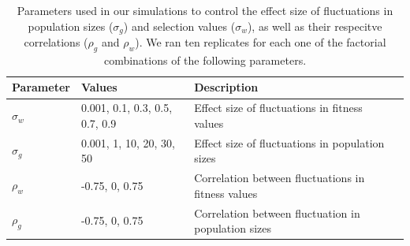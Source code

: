 \documentclass[12pt]{article}
\begin{document}
\begin{table}[h]
\fontsize{10}{18}\selectfont
\centering
\caption{Parameters used in our simulations to control the effect size of fluctuations in population sizes ($\sigma_{g}$) and selection values ($\sigma_{w}$), as well as their respecitve correlations ($\rho_{g}$ and $\rho_{w}$). We ran ten replicates for each one  of the factorial combinations of the following parameters. }
\begin{tabular}{@{}llll@{}}
\toprule
Parameter                    & Values                    & Description                                   &  \\ \midrule
$\sigma_{w}$ & 0.001, 0.1, 0.3, 0.5, 0.7, 0.9 & Effect size of fluctuations in fitness values &  \\
$\sigma_{g}$ & 0.001, 1, 10, 20, 30, 50 & Effect size of fluctuations in population sizes                                              &  \\
$\rho_{w}$  &  -0.75, 0, 0.75                         &   Correlation between fluctuations in fitness values                                            &  \\
$\rho_{g}$  &   -0.75, 0, 0.75                        &  Correlation between fluctuation in population sizes                                             &  \\ \bottomrule
\end{tabular}
\label{tab:fluctuations}
\end{table}
\end{document}

